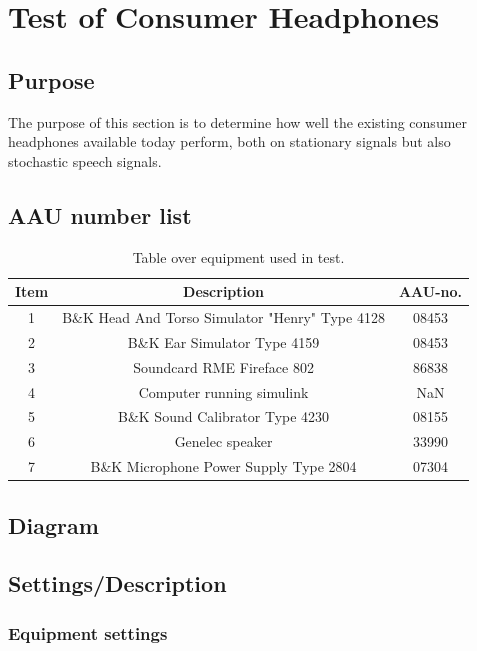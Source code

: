 
\section{Test of Consumer Headphones}

\subsection{Purpose}
The purpose of this section is to determine how well the existing consumer headphones available today perform, both on stationary signals but also stochastic speech signals.




\subsection{AAU number list}
\begin{table}[H]
	\centering
	\begin{tabular}{ c c c } \toprule
		{Item}	& {Description} 						& {AAU-no}. \\ \bottomrule 
		1	&	B\&K Head And Torso Simulator "Henry" Type 4128	& 08453	\\
		2	&	B\&K Ear Simulator Type 4159				& 08453		\\
		3	&	Soundcard RME Fireface 802					& 86838		\\
		4	&	Computer running simulink					& NaN		\\
		5	&	B\&K Sound Calibrator Type 4230				& 08155		\\ 
		6	&	Genelec speaker								& 33990		\\ 
		7	& 	B\&K Microphone Power Supply Type 2804		& 07304		\\
		\bottomrule
	\end{tabular}
	\caption{Table over equipment used in test.}
	\label{tab:UsedEquipmentListConsumerHP}
\end{table}



\subsection{Diagram}



\subsection{Settings/Description}
	\subsubsection{Equipment settings}
	
